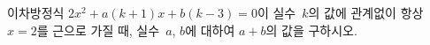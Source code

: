 이차방정식 $2x^2+a(k+1)x+b(k-3)=0$이 실수~$k$의 값에 관계없이 항상 $x=2$를 근으로 가질 때, 실수~$a$, $b$에 대하여 $a+b$의 값을 구하시오.
